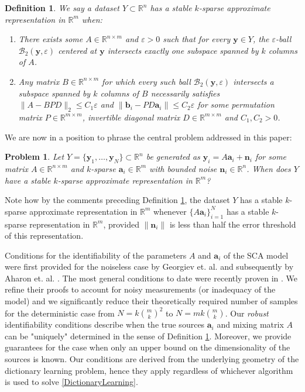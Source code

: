 \documentclass[journal, onecolumn]{IEEEtran}
\newtheorem{problem}{Problem}
\newtheorem{definition}{Definition}
\begin{document}
\begin{definition}\label{Uniqueness}
We say a dataset $Y \subset \mathbb{R}^n$ has a stable $k$-sparse approximate representation in $\mathbb{R}^m$ when:
\begin{enumerate}
\item There exists some $A \in \mathbb{R}^{n \times m}$ and $\varepsilon > 0$ such that for every $\mathbf{y} \in Y$, the $\varepsilon$-ball $\mathcal{B}_2(\mathbf{y}, \varepsilon)$ centered at $\mathbf{y}$ intersects exactly one subspace spanned by $k$ columns of $A$.
\item Any matrix $B \in \mathbb{R}^{n \times m}$ for which every such ball $\mathcal{B}_2(\mathbf{y}, \varepsilon)$ intersects a subspace spanned by $k$ columns of $B$ necessarily satisfies $\|A - BPD\|_2 \leq C_1\varepsilon$ and $\|\mathbf{b}_i - PD\mathbf{a}_i\| \leq C_2\varepsilon$ for some permutation matrix $P \in \mathbb{R}^{m \times m}$, invertible diagonal matrix $D \in \mathbb{R}^{m \times m}$ and $C_1, C_2 > 0$.
\end{enumerate}
\end{definition}

We are now in a position to phrase the central problem addressed in this paper:

\begin{problem}\label{DUTproblem}
Let $Y = \{\mathbf{y}_1, \ldots, \mathbf{y}_N \} \subset \mathbb{R}^n$ be generated as $\mathbf{y}_i = A\mathbf{a}_i  + \mathbf{n}_i$ for some matrix $A \in \mathbb{R}^{n \times m}$ and $k$-sparse $\mathbf{a}_i \in \mathbb{R}^m$ with bounded noise $\mathbf{n}_i \in \mathbb{R}^n$. When does $Y$ have a stable $k$-sparse approximate representation in $\mathbb{R}^m$?
\end{problem}

Note how by the comments preceding Definition \ref{Uniqueness}, the dataset $Y$ has a stable $k$-sparse approximate representation in $\mathbb{R}^m$ whenever $\{A\mathbf{a}_i\}_{i=1}^N$ has a stable $k$-sparse representation in $\mathbb{R}^m$, provided $\|\mathbf{n}_i\|$ is less than half the error threshold of this representation.

Conditions for the identifiability of the parameters $A$ and $\mathbf{a}_i$ of the SCA model were first provided for the noiseless case by Georgiev et. al. \cite{Georgiev05} and subsequently by Aharon et. al. \cite{Aharon06}. The most general conditions to date were recently proven in \cite{HS11}. We refine their proofs to account for noisy measurements (or inadequacy of the model) and we significantly reduce their theoretically required number of samples for the deterministic case from $N=k{m \choose k}^2$ to $N = mk{m \choose k}$. Our \emph{robust} identifiability conditions describe when the true sources $\mathbf{a}_i$ and mixing matrix $A$ can be "uniquely" determined in the sense of Definition \ref{Uniqueness}. Moreover, we provide guarantees for the case when only an upper bound on the dimensionality of the sources is known. Our conditions are derived from the underlying geometry of the dictionary learning problem, hence they apply regardless of whichever algorithm is used to solve \eqref{DictionaryLearning}. 
\end{document}
